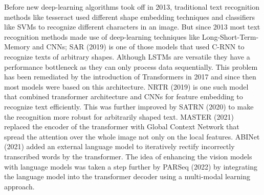 Before new deep-learning algorithms took off in 2013, traditional text recognition methods like tesseract \cite{smith_overview_2007} used different shape embedding techniques and classifiers like SVMs to recognize different characters in an image. But since 2013 most text recognition methods made use of deep-learning techniques like Long-Short-Term-Memory and CNNs; SAR \cite{li_show_2019} (2019) is one of those models that used C-RNN to recognize texts of arbitrary shapes. Although LSTMs are versatile they have a performance bottleneck as they can only process data sequentially. This problem has been remediated by the introduction of Transformers \cite{vaswani_attention_2017} in 2017 and since then most models were based on this architecture. NRTR \cite{sheng_nrtr_2019} (2019) is one such model that combined transformer architecture and CNNs for feature embedding to recognize text efficiently. This was further improved by SATRN \cite{lee_recognizing_2020} (2020) to make the recognition more robust for arbitrarily shaped text.  MASTER \cite{lu_master_2021} (2021) replaced the encoder of the transformer with Global Context Network that spread the attention over the whole image not only on the local features. ABINet \cite{fang_read_2021} (2021) added an external language model to iteratively rectify incorrectly transcribed words by the transformer. The idea of enhancing the vision models with language models was taken a step further by PARSeq \cite{bautista_scene_2022} (2022) by integrating the language model into the transformer decoder using a multi-modal learning approach.